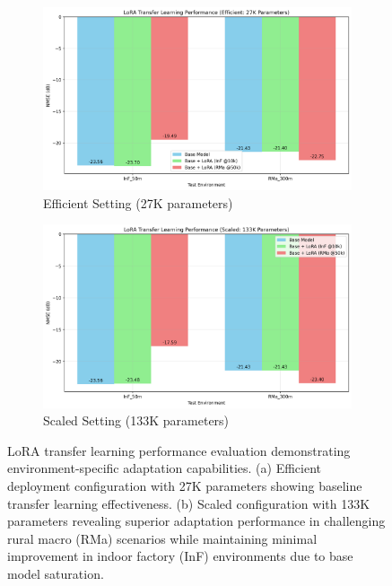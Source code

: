 \documentclass[conference]{IEEEtran}
\begin{document}
\begin{figure}[t]
\centering
\begin{subfigure}[b]{0.48\textwidth}
\centering
\includegraphics[width=\textwidth]{figures/lora_efficient_final.png}
\caption{Efficient Setting (27K parameters)}
\label{fig:lora_efficient}
\end{subfigure}
\hfill
\begin{subfigure}[b]{0.48\textwidth}
\centering
\includegraphics[width=\textwidth]{figures/lora_scaled_final.png}
\caption{Scaled Setting (133K parameters)}
\label{fig:lora_scaled}
\end{subfigure}
\caption{LoRA transfer learning performance evaluation demonstrating environment-specific adaptation capabilities. (a) Efficient deployment configuration with 27K parameters showing baseline transfer learning effectiveness. (b) Scaled configuration with 133K parameters revealing superior adaptation performance in challenging rural macro (RMa) scenarios while maintaining minimal improvement in indoor factory (InF) environments due to base model saturation.}
\label{fig:lora_performance}
\end{figure}
\end{document}
